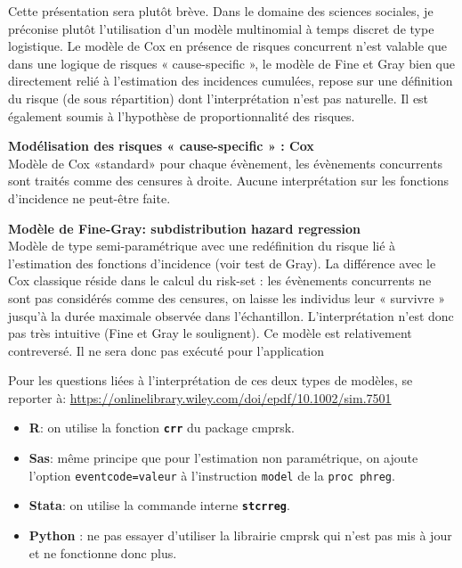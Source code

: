 \documentclass[
  12pt,
  letterpaper,
  DIV=11,
  numbers=noendperiod,
  onepage,
  openany]{scrreprt}
\begin{document}
Cette présentation sera plutôt brève. Dans le domaine des sciences
sociales, je préconise plutôt l'utilisation d'un modèle multinomial à
temps discret de type logistique. Le modèle de Cox en présence de
risques concurrent n'est valable que dans une logique de risques «
cause-specific », le modèle de Fine et Gray bien que directement relié à
l'estimation des incidences cumulées, repose sur une définition du
risque (de sous répartition) dont l'interprétation n'est pas naturelle.
Il est également soumis à l'hypothèse de proportionnalité des risques.

\textbf{Modélisation des risques « cause-specific » : Cox}\\
Modèle de Cox «standard» pour chaque évènement, les évènements
concurrents sont traités comme des censures à droite. Aucune
interprétation sur les fonctions d'incidence ne peut-être faite.

\textbf{Modèle de Fine-Gray: subdistribution hazard regression}\\
Modèle de type semi-paramétrique avec une redéfinition du risque lié à
l'estimation des fonctions d'incidence (voir test de Gray). La
différence avec le Cox classique réside dans le calcul du risk-set : les
évènements concurrents ne sont pas considérés comme des censures, on
laisse les individus leur « survivre » jusqu'à la durée maximale
observée dans l'échantillon. L'interprétation n'est donc pas très
intuitive (Fine et Gray le soulignent). Ce modèle est relativement
contreversé. Il ne sera donc pas exécuté pour l'application

Pour les questions liées à l'interprétation de ces deux types de
modèles, se reporter à:
\url{https://onlinelibrary.wiley.com/doi/epdf/10.1002/sim.7501}

\begin{tcolorbox}[enhanced jigsaw, arc=.35mm, bottomrule=.15mm, titlerule=0mm, colbacktitle=quarto-callout-tip-color!10!white, left=2mm, opacitybacktitle=0.6, toprule=.15mm, title=\textcolor{quarto-callout-tip-color}{\faLightbulb}\hspace{0.5em}{R-Stata-Sas-Python}, colframe=quarto-callout-tip-color-frame, breakable, coltitle=black, opacityback=0, toptitle=1mm, bottomtitle=1mm, rightrule=.15mm, leftrule=.75mm, colback=white]

\begin{itemize}
\item
  \textbf{R}: on utilise la fonction \textbf{\texttt{crr}} du package
  cmprsk.
\item
  \textbf{Sas}: même principe que pour l'estimation non paramétrique, on
  ajoute l'option \texttt{eventcode=valeur} à l'instruction
  \texttt{model} de la \texttt{proc\ phreg}.
\item
  \textbf{Stata}: on utilise la commande interne
  \textbf{\texttt{stcrreg}}.
\item
  \textbf{Python} : ne pas essayer d'utiliser la librairie cmprsk qui
  n'est pas mis à jour et ne fonctionne donc plus.
\end{itemize}

\end{tcolorbox}
\end{document}
